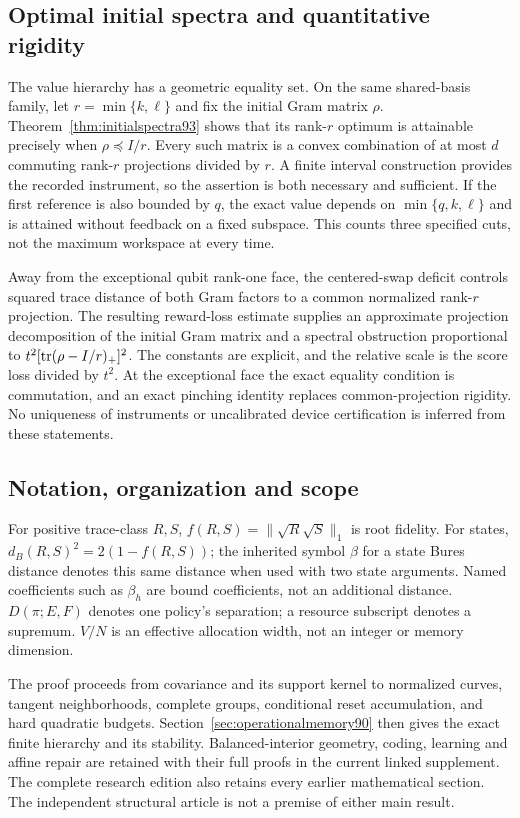 \subsection{Optimal initial spectra and quantitative rigidity}
The value hierarchy has a geometric equality set.  On the same
shared-basis family, let $r=\min\{k,\ell\}$ and fix the initial
Gram matrix $\rho$.  Theorem~\ref{thm:initialspectra93} shows that
its rank-$r$ optimum is attainable precisely when $\rho\preceq I/r$.
Every such matrix is a convex combination of at most $d$ commuting
rank-$r$ projections divided by $r$.  A finite interval construction
provides the recorded instrument, so the assertion is both necessary
and sufficient.  If the first reference is also bounded by $q$, the
exact value depends on $\min\{q,k,\ell\}$ and is attained without
feedback on a fixed subspace.  This counts three specified cuts,
not the maximum workspace at every time.

Away from the exceptional qubit rank-one face, the centered-swap
deficit controls squared trace distance of both Gram factors to a
common normalized rank-$r$ projection.  The resulting reward-loss
estimate supplies an approximate projection decomposition of the
initial Gram matrix and a spectral obstruction proportional to
$t^2[\operatorname{tr}(\rho-I/r)_+]^2$.  The constants are explicit, and the
relative scale is the score loss divided by $t^2$.
At the exceptional face the exact equality condition is commutation,
and an exact pinching identity replaces common-projection rigidity.
No uniqueness of instruments or uncalibrated device certification is
inferred from these statements.

\subsection{Notation, organization and scope}
For positive trace-class $R,S$, $f(R,S)=\|\sqrt R\sqrt S\|_1$ is root
fidelity.  For states, $d_B(R,S)^2=2(1-f(R,S))$; the inherited symbol
$\beta$ for a state Bures distance denotes this same distance when used
with two state arguments.  Named coefficients such as $\beta_h$ are
bound coefficients, not an additional distance.  $D(\pi;E,F)$ denotes
one policy's separation; a resource subscript denotes a supremum.
$V/N$ is an effective allocation width, not an integer or memory dimension.

The proof proceeds from covariance and its support kernel to normalized
curves, tangent neighborhoods, complete groups, conditional reset
accumulation, and hard quadratic budgets.  Section~\ref{sec:operationalmemory90}
then gives the exact finite hierarchy and its stability.  Balanced-interior
geometry, coding, learning and affine repair are retained with their full
proofs in the current linked supplement.  The complete research edition
also retains every earlier mathematical section.  The independent
structural article is not a premise of either main result.

